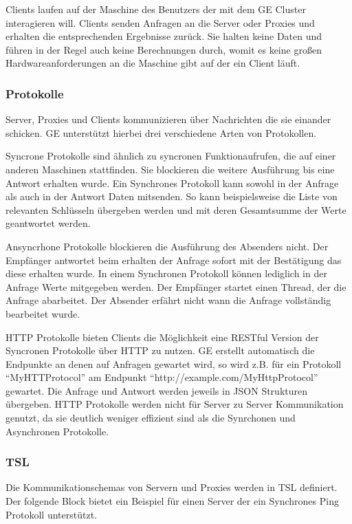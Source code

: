 Clients laufen auf der Maschine des Benutzers der mit dem GE Cluster interagieren will. Clients senden Anfragen an die Server oder Proxies und
erhalten die entsprechenden Ergebnisse zurück. Sie halten keine Daten und führen in der Regel auch keine Berechnungen durch, womit es keine großen Hardwareanforderungen
an die Maschine gibt auf der ein Client läuft.

\subsubsection{Protokolle}

Server, Proxies und Clients kommunizieren über Nachrichten die sie einander schicken. GE unterstützt hierbei drei verschiedene Arten von Protokollen.


Syncrone Protokolle sind ähnlich zu syncronen Funktionaufrufen, die auf einer anderen Maschinen stattfinden. Sie blockieren die weitere Ausführung bis
eine Antwort erhalten wurde. Ein Synchrones Protokoll kann sowohl in der Anfrage als auch in der Antwort Daten mitsenden. So kann beispielsweise die Liste von
relevanten Schlüsseln übergeben werden und mit deren Gesamtsumme der Werte geantwortet werden.


Ansyncrhone Protokolle blockieren die Ausführung des Absenders nicht. Der Empfänger antwortet beim erhalten der Anfrage sofort mit der Bestätigung das diese erhalten wurde.
In einem Synchronen Protokoll können lediglich in der Anfrage Werte mitgegeben werden.
Der Empfänger startet einen Thread, der die Anfrage abarbeitet. Der Absender erfährt nicht wann die Anfrage vollständig bearbeitet wurde.


HTTP Protokolle bieten Clients die Möglichkeit eine RESTful Version der Syncronen Protokolle über HTTP zu nutzen. GE erstellt automatisch die Endpunkte an denen
auf Anfragen gewartet wird, so wird z.B. für ein Protokoll ``MyHTTProtocol'' am Endpunkt ``http://example.com/MyHttpProtocol'' gewartet. Die Anfrage und
Antwort werden jeweils in JSON Strukturen übergeben. HTTP Protokolle werden nicht für Server zu Server Kommunikation genutzt, da sie deutlich weniger effizient sind als die
Synrchonen und Asynchronen Protokolle.

\subsubsection{TSL}

Die Kommunikationschemas von Servern und Proxies werden in TSL definiert. Der folgende Block bietet ein Beispiel für einen Server der ein Synchrones Ping Protokoll unterstützt.

